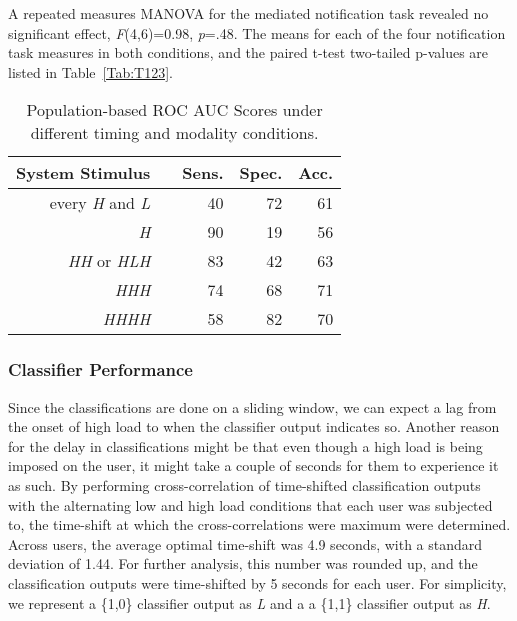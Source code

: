 A repeated measures MANOVA for the mediated notification task revealed no significant effect, \textit{F}(4,6)=0.98, \textit{p}=.48. The means for each of the four notification task measures in both conditions, and the paired t-test two-tailed p-values are listed in Table~\ref{Tab:T123}.

\begin{table}
\centering
\begin{tabular}{@{}rcrrr@{}}\toprule
System Stimulus & \phantom{a} & Sens. & Spec. & Acc.\\
 \midrule
 every \textit{H} and \textit{L} && 40 & 72 & 61 \\
 \textit{H} 
 && 90 & 19 & 56 \\
 \midrule
 \textit{HH} or \textit{HLH}
 && 83 & 42 & 63 \\
 \textit{HHH} 
 && 74 & 68 & 71 \\
 \textit{HHHH} 
 && 58 & 82 & 70 \\

 \bottomrule
\end{tabular}
\caption{Population-based ROC AUC Scores under different timing and modality conditions.}
\label{Tab:Spec}
\end{table}

\subsubsection{Classifier Performance}
Since the classifications are done on a sliding window, we can expect a lag from the onset of high load to when the classifier output indicates so. Another reason for the delay in classifications might be that even though a high load is being imposed on the user, it might take a couple of seconds for them to experience it as such. By performing cross-correlation of time-shifted classification outputs with the alternating low and high load conditions that each user was subjected to, the time-shift at which the cross-correlations were maximum were determined. Across users, the average optimal time-shift was 4.9 seconds, with a standard deviation of 1.44. For further analysis, this number was rounded up, and the classification outputs were time-shifted by 5 seconds for each user. For simplicity, we represent a \{1,0\} classifier output as \textit{L} and a a \{1,1\} classifier output as \textit{H}. 


